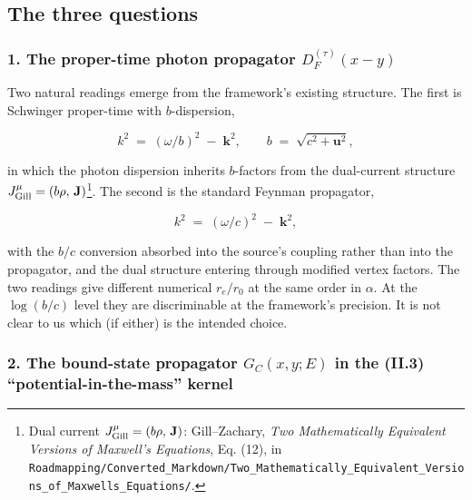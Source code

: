 \documentclass[
  11pt,
]{article}
\begin{document}
\hypertarget{the-three-questions}{%
\subsection{The three questions}\label{the-three-questions}}

\hypertarget{the-proper-time-photon-propagator-d_ftaux-y}{%
\subsubsection{\texorpdfstring{1. The proper-time photon propagator
\(D_F^{(\tau)}(x-y)\)}{1. The proper-time photon propagator D\_F\^{}\{(\textbackslash tau)\}(x-y)}}\label{the-proper-time-photon-propagator-d_ftaux-y}}

Two natural readings emerge from the framework's existing structure. The
first is Schwinger proper-time with \(b\)-dispersion,

\[
k^2 \;=\; (\omega/b)^2 \;-\; \mathbf{k}^2,
\qquad
b \;=\; \sqrt{c^2 + \mathbf{u}^2},
\tag{4}
\]

in which the photon dispersion inherits \(b\)-factors from the
dual-current structure
\(J^\mu_{\rm Gill} = (b\rho,\,\mathbf{J})\)\footnote{Dual current
  \(J^\mu_{\rm Gill} = (b\rho,\,\mathbf{J})\): Gill--Zachary, \emph{Two
  Mathematically Equivalent Versions of Maxwell's Equations}, Eq. (12),
  in
  \texttt{Roadmapping/Converted\_Markdown/Two\_Mathematically\_Equivalent\_Versions\_of\_Maxwells\_Equations/}.}.
The second is the standard Feynman propagator,

\[
k^2 \;=\; (\omega/c)^2 \;-\; \mathbf{k}^2,
\tag{5}
\]

with the \(b/c\) conversion absorbed into the source's coupling rather
than into the propagator, and the dual structure entering through
modified vertex factors. The two readings give different numerical
\(r_e/r_0\) at the same order in \(\alpha\). At the \(\log(b/c)\) level
they are discriminable at the framework's precision. It is not clear to
us which (if either) is the intended choice.

\hypertarget{the-bound-state-propagator-g_cxye-in-the-ii.3-potential-in-the-mass-kernel}{%
\subsubsection{\texorpdfstring{2. The bound-state propagator
\(G_C(x,y;E)\) in the (II.3) ``potential-in-the-mass''
kernel}{2. The bound-state propagator G\_C(x,y;E) in the (II.3) ``potential-in-the-mass'' kernel}}\label{the-bound-state-propagator-g_cxye-in-the-ii.3-potential-in-the-mass-kernel}}
\end{document}
